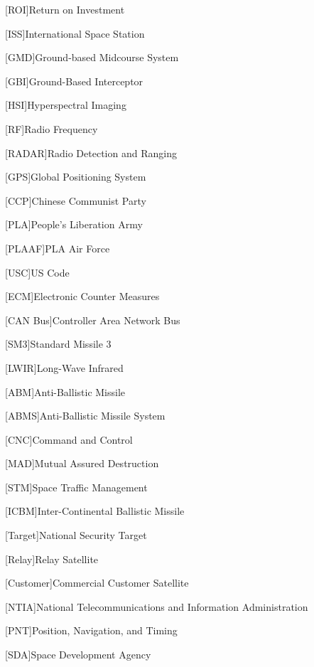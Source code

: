 
[ROI]{Return on Investment}

[ISS]{International Space Station}

[GMD]{Ground-based Midcourse System}

[GBI]{Ground-Based Interceptor}

[HSI]{Hyperspectral Imaging}

[RF]{Radio Frequency}

[RADAR]{Radio Detection and Ranging}

[GPS]{Global Positioning System}

[CCP]{Chinese Communist Party}

[PLA]{People's Liberation Army}

[PLAAF]{PLA Air Force}

[USC]{US Code}

[ECM]{Electronic Counter Measures}

[CAN Bus]{Controller Area Network Bus}

[SM3]{Standard Missile 3}

[LWIR]{Long-Wave Infrared}

[ABM]{Anti-Ballistic Missile}

[ABMS]{Anti-Ballistic Missile System}

[CNC]{Command and Control}

[MAD]{Mutual Assured Destruction}

[STM]{Space Traffic Management}

[ICBM]{Inter-Continental Ballistic Missile}

[Target]{National Security Target}

[Relay]{Relay Satellite}

[Customer]{Commercial Customer Satellite}

[NTIA]{National Telecommunications and Information
  Administration}

[PNT]{Position, Navigation, and Timing}

[SDA]{Space Development Agency}

